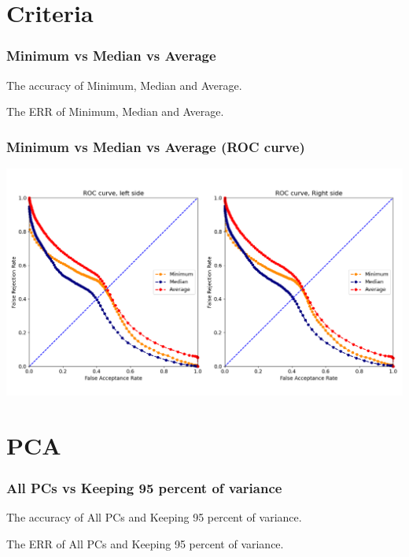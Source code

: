 \documentclass{beamer}
\begin{document}
\section{Criteria}

\begin{frame}
\frametitle{Minimum vs Median vs Average}
\tiny
\begin{table}
\centering
\captionsetup{labelformat=empty}
\caption{\small The accuracy of Minimum, Median and Average.}
\label{tab:parameters condition}

\end{table}
\begin{table}
\centering
\captionsetup{labelformat=empty}
\caption{\small The ERR of Minimum, Median and Average.}
\label{tab:parameters condition}

\end{table}
\end{frame}


\begin{frame}
\centering
\frametitle{Minimum vs Median vs Average (ROC curve)}
\includegraphics[scale=0.3]{Manuscripts/src/figures/Minimum.png}
\end{frame}


\section{PCA}

\begin{frame}
\frametitle{All PCs vs Keeping 95 percent of variance}
\tiny
\begin{table}
\centering
\captionsetup{labelformat=empty}
\caption{\small The accuracy of All PCs and Keeping 95 percent of variance.}
\label{tab:parameters condition}

\end{table}
\begin{table}
\centering
\captionsetup{labelformat=empty}
\caption{\small The ERR of All PCs and Keeping 95 percent of variance.}
\label{tab:parameters condition}

\end{table}
\end{frame}
\end{document}
